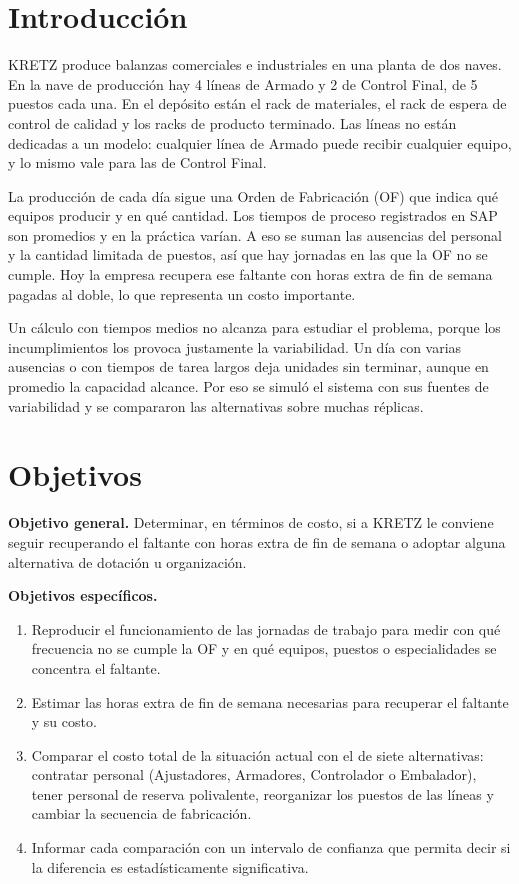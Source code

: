 \documentclass[11pt,a4paper]{article}
\begin{document}
\section{Introducción}

KRETZ produce balanzas comerciales e industriales en una planta de dos naves. En la nave de producción hay 4 líneas de Armado y 2 de Control Final, de 5 puestos cada una. En el depósito están el rack de materiales, el rack de espera de control de calidad y los racks de producto terminado. Las líneas no están dedicadas a un modelo: cualquier línea de Armado puede recibir cualquier equipo, y lo mismo vale para las de Control Final.

La producción de cada día sigue una Orden de Fabricación (OF) que indica qué equipos producir y en qué cantidad. Los tiempos de proceso registrados en SAP son promedios y en la práctica varían. A eso se suman las ausencias del personal y la cantidad limitada de puestos, así que hay jornadas en las que la OF no se cumple. Hoy la empresa recupera ese faltante con horas extra de fin de semana pagadas al doble, lo que representa un costo importante.

Un cálculo con tiempos medios no alcanza para estudiar el problema, porque los incumplimientos los provoca justamente la variabilidad. Un día con varias ausencias o con tiempos de tarea largos deja unidades sin terminar, aunque en promedio la capacidad alcance. Por eso se simuló el sistema con sus fuentes de variabilidad y se compararon las alternativas sobre muchas réplicas.

\section{Objetivos}

\textbf{Objetivo general.} Determinar, en términos de costo, si a KRETZ le conviene seguir recuperando el faltante con horas extra de fin de semana o adoptar alguna alternativa de dotación u organización.

\textbf{Objetivos específicos.}

\begin{enumerate}
\item Reproducir el funcionamiento de las jornadas de trabajo para medir con qué frecuencia no se cumple la OF y en qué equipos, puestos o especialidades se concentra el faltante.
\item Estimar las horas extra de fin de semana necesarias para recuperar el faltante y su costo.
\item Comparar el costo total de la situación actual con el de siete alternativas: contratar personal (Ajustadores, Armadores, Controlador o Embalador), tener personal de reserva polivalente, reorganizar los puestos de las líneas y cambiar la secuencia de fabricación.
\item Informar cada comparación con un intervalo de confianza que permita decir si la diferencia es estadísticamente significativa.
\end{enumerate}
\end{document}
